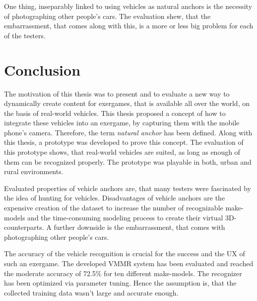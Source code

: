One thing, inseparably linked to using vehicles as natural anchors is the necessity of photographing other people's cars. The evaluation shew, that the embarrassment, that comes along with this, is a more or less big problem for each of the testers.





\chapter{Conclusion}\label{ch:conclusion}
The motivation of this thesis was to present and to evaluate a new way to dynamically create content for exergames, that is available all over the world, on the basis of real-world vehicles. This thesis proposed a concept of how to integrate these vehicles into an exergame, by capturing them with the mobile phone's camera. Therefore, the term \emph{natural anchor} has been defined. Along with this thesis, a prototype was developed to prove this concept. The evaluation of this prototype shows, that real-world vehicles are suited, as long as enough of them can be recognized properly. The prototype was playable in both, urban and rural environments.
 
Evaluated properties of vehicle anchors are, that many testers were fascinated by the idea of hunting for vehicles. Disadvantages of vehicle anchors are the expensive creation of the dataset to increase the number of recognizable make-models and the time-consuming modeling process to create their virtual 3D-counterparts. A further downside is the embarrassment, that comes with photographing other people's cars.
 
The accuracy of the vehicle recognition is crucial for the success and the UX of such an exergame. The developed VMMR system has been evaluated and reached the moderate accuracy of 72.5\% for ten different make-models. The recognizer has been optimized via parameter tuning. Hence the assumption is, that the collected training data wasn't large and accurate enough.
 
